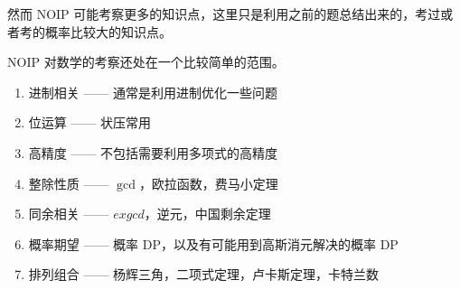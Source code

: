 然而 NOIP 可能考察更多的知识点，这里只是利用之前的题总结出来的，考过或者考的概率比较大的知识点。

NOIP 对数学的考察还处在一个比较简单的范围。

\begin{enumerate}
\item 进制相关 —— 通常是利用进制优化一些问题
\item 位运算 —— 状压常用
\item 高精度 —— 不包括需要利用多项式的高精度
\item 整除性质 —— $\gcd$，欧拉函数，费马小定理
\item 同余相关 —— $exgcd$，逆元，中国剩余定理
\item 概率期望 —— 概率 DP，以及有可能用到高斯消元解决的概率 DP
\item 排列组合 —— 杨辉三角，二项式定理，卢卡斯定理，卡特兰数
\end{enumerate}

